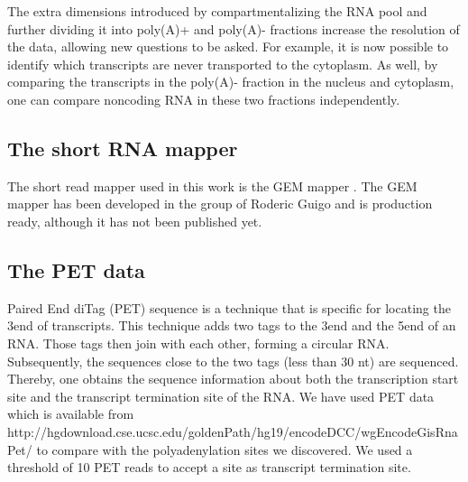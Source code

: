 The extra dimensions introduced by compartmentalizing the RNA pool and further
dividing it into poly(A)+ and poly(A)- fractions increase the resolution of the
data, allowing new questions to be asked. For example, it is now possible to
identify which transcripts are never transported to the cytoplasm. As well, by
comparing the transcripts in the poly(A)- fraction in the nucleus and
cytoplasm, one can compare noncoding RNA in these two fractions independently. 

\subsection{The short RNA mapper}
The short read mapper used in this work is the GEM mapper
\cite{ribeca_gem_2010}. The GEM mapper has been developed in the group of
Roderic Guigo and is production ready, although it has not been published yet.

\subsection{The PET data}
Paired End diTag (PET) sequence is a technique that is specific for locating
the 3\p end of transcripts. This technique adds two tags to the 3\p end and the
5\p end of an RNA. Those tags then join with each other, forming a circular
RNA. Subsequently, the sequences close to the two tags (less than 30 nt) are
sequenced. Thereby, one obtains the sequence information about both the
transcription start site and the transcript termination site of the RNA. We
have used PET data which is available from
http://hgdownload.cse.ucsc.edu/goldenPath/hg19/encodeDCC/wgEncodeGisRnaPet/ to
compare with the polyadenylation sites we discovered. We used a threshold of 10
PET reads to accept a site as transcript termination site.
